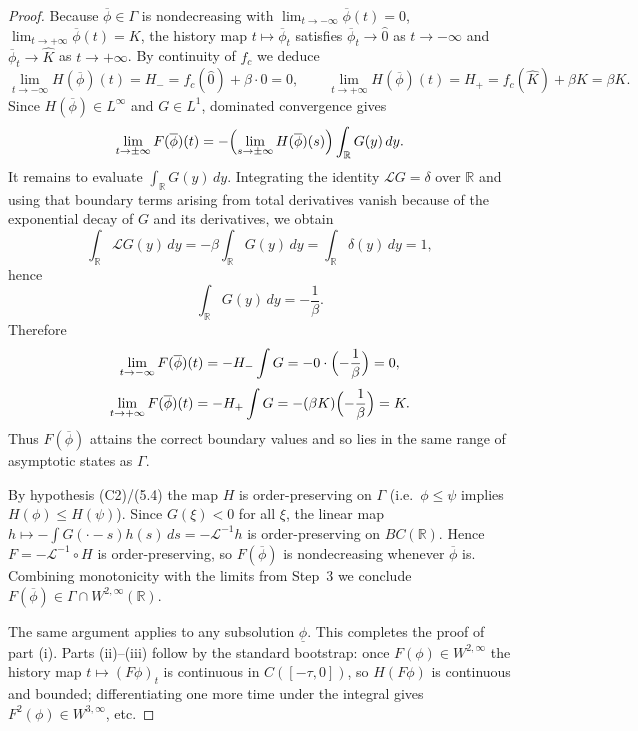 \documentclass[10pt,a4paper]{amsart}
\begin{document}
\begin{proof}
 	Because $\overline\phi\in\Gamma$ is nondecreasing with
 	$\lim_{t\to-\infty}\overline\phi(t)=0$, $\lim_{t\to+\infty}\overline\phi(t)=K$,
 	the history map $t\mapsto\overline\phi_t$ satisfies $\overline\phi_t\to\hat 0$ as $t\to-\infty$
 	and $\overline\phi_t\to\hat K$ as $t\to+\infty$. By continuity of $f_c$ we deduce
 	\[
 	\lim_{t\to-\infty} H(\overline\phi)(t)=H_-=f_c(\hat 0)+\beta\cdot 0=0,
 	\qquad
 	\lim_{t\to+\infty} H(\overline\phi)(t)=H_+=f_c(\hat K)+\beta K=\beta K.
 	\]
 	Since $H(\overline\phi)\in L^\infty$ and $G\in L^1$, dominated convergence gives
 	\[
 	\lim_{t\to\pm\infty} F(\overline\phi)(t)
 	= -\Bigl(\lim_{s\to\pm\infty} H(\overline\phi)(s)\Bigr)\int_{\mathbb R} G(y)\,dy.
 	\]
 	It remains to evaluate $\int_{\mathbb R}G(y)\,dy$. Integrating the identity
 	$\mathcal L G=\delta$ over $\mathbb R$ and using that boundary terms arising from total
 	derivatives vanish because of the exponential decay of $G$ and its derivatives, we obtain
 	\[
 	\int_{\mathbb R} \mathcal L G(y)\,dy = -\beta\int_{\mathbb R} G(y)\,dy = \int_{\mathbb R}\delta(y)\,dy = 1,
 	\]
 	hence
 	\[
 	\int_{\mathbb R} G(y)\,dy = -\frac{1}{\beta}.
 	\]
 	Therefore
 	\[
 	\lim_{t\to-\infty} F(\overline\phi)(t) = -H_- \int G = -0\cdot\Bigl(-\frac{1}{\beta}\Bigr)=0,
 	\]
 	\[
 	\lim_{t\to+\infty} F(\overline\phi)(t) = -H_+ \int G
 	= -(\beta K)\Bigl(-\frac{1}{\beta}\Bigr) = K.
 	\]
 	Thus $F(\overline\phi)$ attains the correct boundary values and so lies in the same
 	range of asymptotic states as $\Gamma$.
 	
 	By hypothesis (C2)/(5.4) the map $H$ is order-preserving on $\Gamma$ (i.e.\ \(\phi\le\psi\)
 	implies \(H(\phi)\le H(\psi)\)). Since $G(\xi)<0$ for all $\xi$, the linear map
 	$h\mapsto -\int G(\cdot-s)h(s)\,ds=-\mathcal L^{-1}h$ is order-preserving on $BC(\mathbb R)$.
 	Hence $F=-\mathcal L^{-1}\circ H$ is order-preserving, so $F(\overline\phi)$ is nondecreasing
 	whenever $\overline\phi$ is. Combining monotonicity with the limits from Step~3 we conclude
 	$F(\overline\phi)\in\Gamma\cap W^{2,\infty}(\mathbb R)$.
 	
 	\medskip
 	The same argument applies to any subsolution $\underline\phi$. This completes the proof of part (i).
 	Parts (ii)--(iii) follow by the standard bootstrap: once $F(\phi)\in W^{2,\infty}$ the history
 	map $t\mapsto (F\phi)_t$ is continuous in $C([-\tau,0])$, so $H(F\phi)$ is continuous and bounded;
 	differentiating one more time under the integral gives $F^2(\phi)\in W^{3,\infty}$, etc.
 \end{proof}
\end{document}
